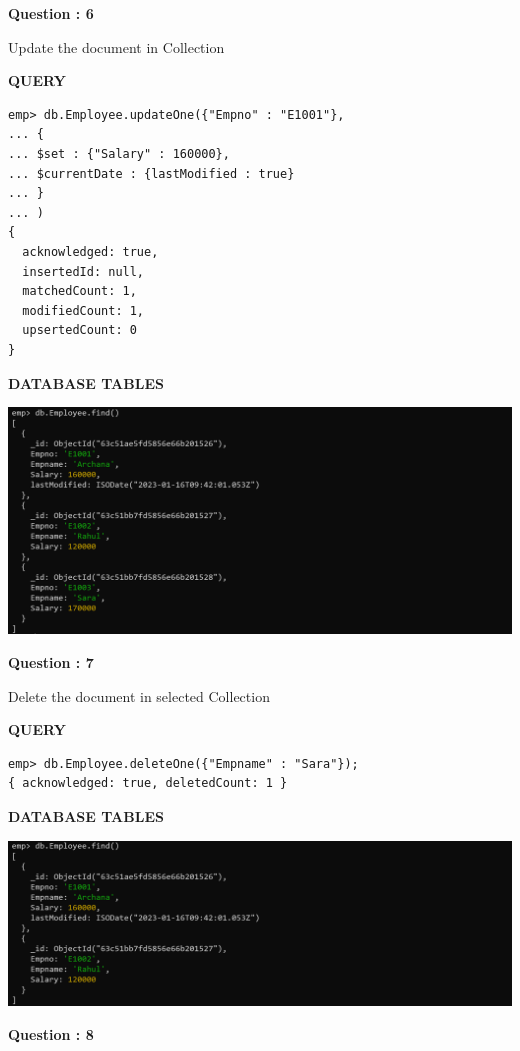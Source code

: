 \documentclass[a4paper,12pt]{report}
\begin{document}
\begin{flushleft}
    \textbf{Question : 6}
\end{flushleft}
Update the document in Collection
\begin{flushleft}
\textbf{QUERY }
\end{flushleft}
 \begin{verbatim}
emp> db.Employee.updateOne({"Empno" : "E1001"},
... {
... $set : {"Salary" : 160000},
... $currentDate : {lastModified : true}
... }
... )
{
  acknowledged: true,
  insertedId: null,
  matchedCount: 1,
  modifiedCount: 1,
  upsertedCount: 0
}
\end{verbatim}
\begin{flushleft}
\textbf{DATABASE TABLES}
\end{flushleft}
\includegraphics[scale=0.4]{M6.png}
\begin{flushleft}
    \textbf{Question : 7}
\end{flushleft}
Delete the document in selected Collection
\begin{flushleft}
\textbf{QUERY }
\end{flushleft}
 \begin{verbatim}
emp> db.Employee.deleteOne({"Empname" : "Sara"});
{ acknowledged: true, deletedCount: 1 }
\end{verbatim}
\begin{flushleft}
\textbf{DATABASE TABLES}
\end{flushleft}
\includegraphics[scale=0.4]{M8.png}
\begin{flushleft}
    \textbf{Question : 8}
\end{flushleft}
\end{document}
